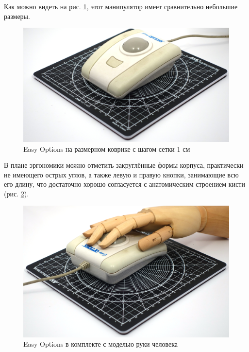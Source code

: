 \documentclass[11pt, a4paper]{article}
\begin{document}
Как можно видеть на рис. \ref{fig:EasyOptionsSize}, этот манипулятор имеет сравнительно небольшие размеры.

\begin{figure}[h]
    \centering
    \includegraphics[scale=0.35]{1993_easy_options_trackball/size_30.jpg}
    \caption{Easy Options на размерном коврике с шагом сетки 1 см}
    \label{fig:EasyOptionsSize}
\end{figure}

В плане эргономики можно отметить закруглённые формы корпуса, практически не имеющего острых углов, а также левую и правую кнопки, занимающие всю его длину, что достаточно хорошо согласуется с анатомическим строением кисти (рис. \ref{fig:EasyOptionsHand}).

\begin{figure}[h]
    \centering
    \includegraphics[scale=0.35]{1993_easy_options_trackball/hand_30.jpg}
    \caption{Easy Options в комплекте с моделью руки человека}
    \label{fig:EasyOptionsHand}
\end{figure}
\end{document}
